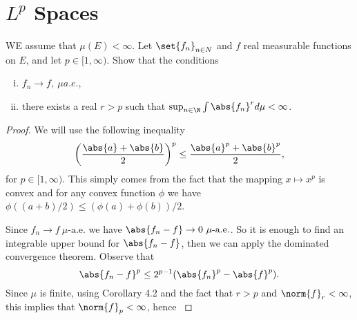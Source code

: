 \chapter{$ L^p $ Spaces}


\begin{problem}
	WE assume that $ \mu(E) < \infty $. Let $ \set{f_n}_{n\in N} $ and $ f $ real measurable functions on $ E $, and let $ p \in [1,\infty) $. Show that the conditions
	\begin{enumerate}[(i)]
		\item $ f_n \to f,\ \mu a.e. $,
		\item there exists a real $ r>p $ such that $ \sup_{n\in\N} \int \abs{f_n}^r d\mu < \infty $.
	\end{enumerate}
\end{problem}
\begin{proof}
	We will use the following inequality
	\[ \left(\frac{\abs{a} + \abs{b}}{2}\right)^p \leq \frac{\abs{a}^p + \abs{b}^p}{2}, \]
	for $ p \in [1,\infty) $. This simply comes from the fact that the mapping $ x\mapsto x^p $ is convex and for any convex function $ \phi $ we have $ \phi((a+b)/2) \leq (\phi(a) + \phi(b))/2 $.
	
	Since $ f_n \to f \ \mu\text{-a.e.} $ we have $ \abs{f_n - f} \to 0 \ \mu\text{-a.e.} $. So it is enough to find an integrable upper bound for $ \abs{f_n - f} $, then we can apply the dominated convergence theorem. Observe that
	\[ \abs{f_n - f}^p \leq 2^{p-1}(\abs{f_n}^p - \abs{f}^p). \]
	Since $ \mu $ is finite, using Corollary 4.2 and the fact that $ r>p $ and $ \norm{f}_r < \infty$, this implies that $ \norm{f}_p <\infty $, hence $  $
\end{proof}